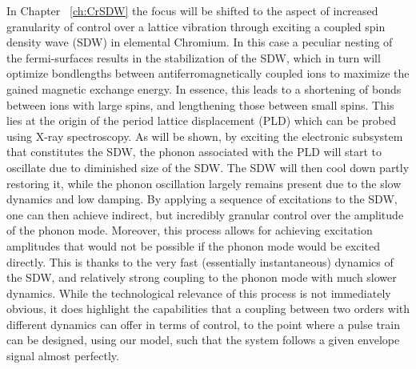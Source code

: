 In Chapter ~\ref{ch:CrSDW} the focus will be shifted to the aspect of increased granularity of control over a lattice vibration through exciting a coupled spin density wave (SDW) in elemental Chromium.
In this case a peculiar nesting of the fermi-surfaces results in the stabilization of the SDW, which in turn will optimize bondlengths between antiferromagnetically coupled ions to maximize the gained magnetic exchange energy.
In essence, this leads to a shortening of bonds between ions with large spins, and lengthening those between small spins. This lies at the origin of the period lattice displacement (PLD) which can be probed using X-ray spectroscopy.
As will be shown, by exciting the electronic subsystem that constitutes the SDW, the phonon associated with the PLD will start to oscillate due to diminished size of the SDW.
The SDW will then cool down partly restoring it, while the phonon oscillation largely remains present due to the slow dynamics and low damping.
By applying a sequence of excitations to the SDW, one can then achieve indirect, but incredibly granular control over the amplitude of the phonon mode.
Moreover, this process allows for achieving excitation amplitudes that would not be possible if the phonon mode would be excited directly.
This is thanks to the very fast (essentially instantaneous) dynamics of the SDW, and relatively strong coupling to the phonon mode with much slower dynamics.
While the technological relevance of this process is not immediately obvious, it does highlight the capabilities that a coupling between two orders with different dynamics can offer in terms of control, to the point where a pulse train can be designed, using our model, such that the system follows a given envelope signal almost perfectly.

